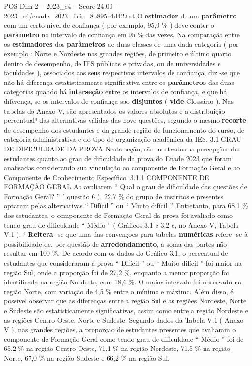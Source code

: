 \begin{textsample}{POS Dim 2 – 2023\_c4 – Score 24.00 – 2023\_c4/enade\_2023\_fisio\_8b895e4d42.txt}
O \textbf{estimador} de um \textbf{parâmetro} com um certo nível de confiança ( por exemplo, 95,0 \% ) deve conter o \textbf{parâmetro} no intervalo de confiança em 95 \% das vezes.
Na comparação entre os \textbf{estimadores} dos \textbf{parâmetros} de duas classes de uma dada categoria ( por exemplo : Norte e Nordeste nas grandes regiões, de primeiro e último quarto dentro de desempenho, de IES públicas e privadas, ou de universidades e faculdades ), associados aos seus respectivos intervalos de confiança, diz -se que não há diferença estatisticamente significativa entre os \textbf{parâmetros} das duas categorias quando há \textbf{interseção} entre os intervalos de confiança, e que há diferença, se os intervalos de confiança são \textbf{disjuntos} ( \textbf{vide} Glossário ).
Nas tabelas do Anexo V, são apresentados os valores absolutos e a distribuição percentual⁴ das alternativas válidas das nove questões, segundo o mesmo \textbf{recorte} de desempenho dos estudantes e da grande região de funcionamento do curso, de categoria administrativa e do tipo de organização acadêmica da IES. 3.1 GRAU DE DIFICULDADE DA PROVA Nesta seção, são mostradas as percepções dos estudantes quanto ao grau de dificuldade da prova do Enade 2023 que foram analisadas considerando sua vinculação ao componente de Formação Geral e ao Componente de Conhecimento Específico. 3.1.1 COMPONENTE DE FORMAÇÃO GERAL Ao avaliarem “ Qual o grau de dificuldade das questões de Formação Geral? ” ( questão 6 ), 22,7 \% do grupo de inscritos e presentes optaram pelas alternativas “ Difícil ” ou “ Muito difícil ”.
Entretanto, para 68,1 \% dos estudantes, o componente de Formação Geral da prova foi avaliado como tendo grau de dificuldade “ Médio ” ( Gráficos 3.1 e 3.2 e, no Anexo V, Tabela V.1 ). ⁴ \textbf{Reitera} -se que uma das convenções para tabelas \textbf{numéricas} refere -se à possibilidade de, por questão de \textbf{arredondamento}, a soma das partes não resultar em 100 \%.
De acordo com os dados do Gráfico 3.1, o percentual de estudantes que consideraram a prova “ Difícil ” ou “ Muito difícil ” foi maior na região Sul, onde a proporção foi de 27,2 \%, enquanto a menor proporção foi identificada na região Nordeste, com 18,6 \%.
O maior intervalo foi observado na região Norte, com variação de 4,5 \% entre o mínimo e máximo.
Além disso, é possível observar que as diferenças entre a região Sul e as regiões Nordeste, Norte e Sudeste são estatisticamente significativas, assim como entre a região Nordeste e as regiões Centro-Oeste, Norte e Sudeste.
Segundo dados da Tabela V.1 ( Anexo V ), nas grandes regiões, a proporção de estudantes presentes que avaliaram o componente de Formação Geral como tendo grau de dificuldade “ Médio ” foi de 65,2 \% na região Centro-Oeste, 71,1 \% na região Nordeste, 71,5 \% na região Norte, 67,0 \% na região Sudeste e 66,2 \% na região Sul.

\end{textsample}
